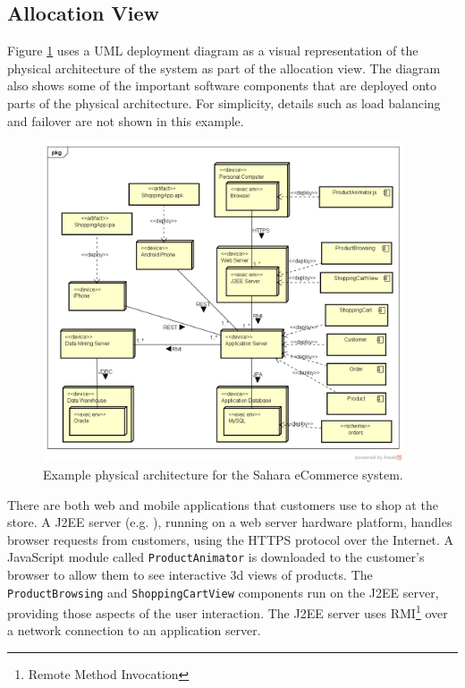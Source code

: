 \subsection{Allocation View}\label{sec:storeAllocView}
Figure \ref{fig:deploymentDiagram} uses a UML deployment diagram as a visual representation of the physical architecture of the system as part of the allocation view.
The diagram also shows some of the important software components that are deployed onto parts of the physical architecture.
For simplicity, details such as load balancing and failover are not shown in this example.

\begin{figure}[h!]
    \centering
    \includegraphics[trim=38 38 23 44,clip,width=0.95\textwidth]{images/uml/deployment_diagram.png}
    \caption{Example physical architecture for the Sahara eCommerce system.}
    \label{fig:deploymentDiagram}
\end{figure}

There are both web and mobile applications that customers use to shop at the store.
A J2EE server (e.g. ), running on a web server hardware platform,
handles browser requests from customers, using the HTTPS protocol over the Internet.
A JavaScript module called \texttt{ProductAnimator} is downloaded to the customer's browser to allow them to see interactive 3d views of products.
The \texttt{ProductBrowsing} and \texttt{ShoppingCartView} components run on the J2EE server, providing those aspects of the user interaction.
The J2EE server uses RMI\footnote{Remote Method Invocation} over a network connection to an application server.

